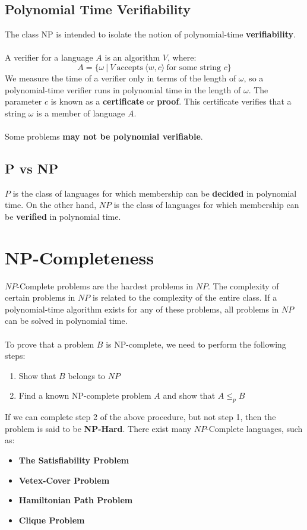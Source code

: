\documentclass{article}
\begin{document}
\subsection{Polynomial Time Verifiability}
The class NP is intended to isolate the notion of polynomial-time \textbf{verifiability}. \\ \\
A verifier for a language $A$ is an algorithm $V$, where:
\[ A = \{ \omega ~|~ V~\text{accepts}~ \langle w, c \rangle~\text{for some string $c$} \} \]
We measure the time of a verifier only in terms of the length of $\omega$, so a polynomial-time verifier runs in polynomial time in the length of $\omega$. The parameter $c$ is known as a \textbf{certificate} or \textbf{proof}. This certificate verifies that a string $\omega$ is a member of language $A$. \\ \\
 Some problems \textbf{may not be polynomial verifiable}.
 
\subsection{P vs NP}
 $P$ is the class of languages for which membership can be \textbf{decided} in polynomial time. On the other hand, $NP$ is the class of languages for which membership can be \textbf{verified} in polynomial time.

\section{NP-Completeness}
$NP$-Complete problems are the hardest problems in $NP$. The complexity of certain problems in $NP$ is related to the complexity of the entire class. If a polynomial-time algorithm exists for any of these problems, all problems in $NP$ can be solved in polynomial time. \\ \\
To prove that a problem $B$ is NP-complete, we need to perform the following steps:

\begin{enumerate}
	\item Show that $B$ belongs to $NP$
	\item Find a known NP-complete problem $A$ and show that $A \leq_p B$
\end{enumerate}
If we can complete step 2 of the above procedure, but not step 1, then the problem is said to be \textbf{NP-Hard}. There exist many $NP$-Complete languages, such as:

\begin{itemize}
	\item \textbf{The Satisfiability Problem}
	\item \textbf{Vetex-Cover Problem}
	\item \textbf{Hamiltonian Path Problem}
	\item \textbf{Clique Problem}
\end{itemize}
\end{document}
